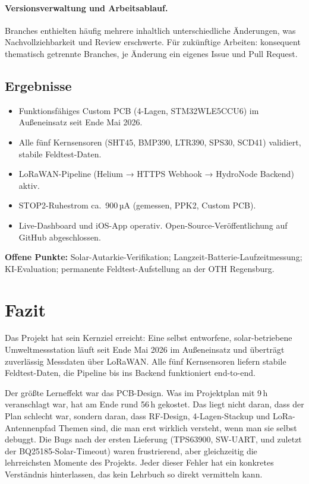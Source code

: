 \documentclass[11pt,a4paper]{scrartcl}
\begin{document}
\paragraph{Versionsverwaltung und Arbeitsablauf.}
Branches enthielten häufig mehrere inhaltlich unterschiedliche Änderungen, was Nachvollziehbarkeit und Review erschwerte. Für zukünftige Arbeiten: konsequent thematisch getrennte Branches, je Änderung ein eigenes Issue und Pull Request.

\subsection*{Ergebnisse}

\begin{itemize}
  \item Funktionsfähiges Custom PCB (4-Lagen, STM32WLE5CCU6) im Außeneinsatz seit Ende Mai 2026.
  \item Alle fünf Kernsensoren (SHT45, BMP390, LTR390, SPS30, SCD41) validiert, stabile Feldtest-Daten.
  \item LoRaWAN-Pipeline (Helium → HTTPS Webhook → HydroNode Backend) aktiv.
  \item STOP2-Ruhestrom ca.~900\,µA (gemessen, PPK2, Custom PCB).
  \item Live-Dashboard und iOS-App operativ. Open-Source-Veröffentlichung auf GitHub abgeschlossen.
\end{itemize}

\textbf{Offene Punkte:} Solar-Autarkie-Verifikation; Langzeit-Batterie-Laufzeitmessung; KI-Evaluation; permanente Feldtest-Aufstellung an der OTH Regensburg.

\clearpage
\section{Fazit}

Das Projekt hat sein Kernziel erreicht: Eine selbst entworfene, solar-betriebene Umweltmessstation läuft seit Ende Mai 2026 im Außeneinsatz und überträgt zuverlässig Messdaten über LoRaWAN. Alle fünf Kernsensoren liefern stabile Feldtest-Daten, die Pipeline bis ins Backend funktioniert end-to-end.

Der größte Lerneffekt war das PCB-Design. Was im Projektplan mit 9\,h veranschlagt war, hat am Ende rund 56\,h gekostet. Das liegt nicht daran, dass der Plan schlecht war, sondern daran, dass RF-Design, 4-Lagen-Stackup und LoRa-Antennenpfad Themen sind, die man erst wirklich versteht, wenn man sie selbst debuggt. Die Bugs nach der ersten Lieferung (TPS63900, SW-UART, und zuletzt der BQ25185-Solar-Timeout) waren frustrierend, aber gleichzeitig die lehrreichsten Momente des Projekts. Jeder dieser Fehler hat ein konkretes Verständnis hinterlassen, das kein Lehrbuch so direkt vermitteln kann.
\end{document}
